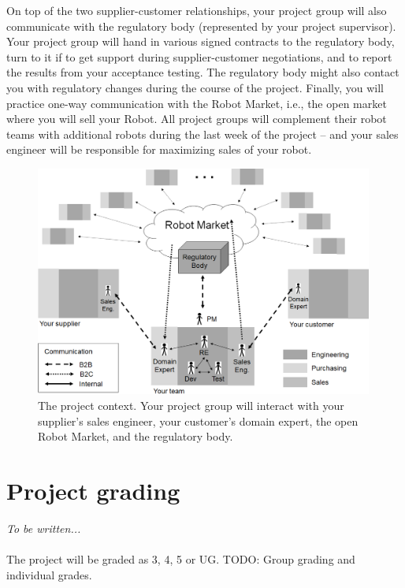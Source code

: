 \documentclass{scrreprt}
\begin{document}
On top of the two supplier-customer relationships, your project group will also communicate with the regulatory body (represented by your project supervisor). Your project group will hand in various signed contracts to the regulatory body, turn to it if to get support during supplier-customer negotiations, and to report the results from your acceptance testing. The regulatory body might also contact you with regulatory changes during the course of the project. Finally, you will practice one-way communication with the Robot Market, i.e., the open market where you will sell your Robot. All project groups will complement their robot teams with additional robots during the last week of the project -- and your sales engineer will be responsible for maximizing sales of your robot. 

\begin{figure}
\centering
\includegraphics[width=0.99\textwidth]{figures/projectContext.png}
\caption{The project context. Your project group will interact with your supplier's sales engineer, your customer's domain expert, the open Robot Market, and the regulatory body.}
\label{fig:context}
\end{figure}

\section{Project grading}
\textit{To be written...}\\\\
The project will be graded as 3, 4, 5 or UG. TODO: Group grading and individual grades.
\end{document}
